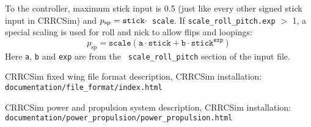 \documentclass[a4paper, 11pt, pdftex]{article}
\newcommand{\vi}[1]{_{\textrm{#1}}}
\begin{document}
    To the controller, maximum stick input is 0.5 (just like every other
    signed stick input in CRRCSim) and $p\vi{sp} = {\tt stick} \cdot ${\tt
    scale}. If {\tt scale\_roll\_pitch.exp} $>$ 1, a special scaling is used for
    roll and nick to allow flips and loopings:    
    \begin{equation}
      p\vi{sp} = \texttt{scale} \left( \texttt{a} \cdot \texttt{stick}
                 + \texttt{b} \cdot \texttt{stick}^\texttt{exp}
                 \right)
    \end{equation}
    Here {\tt a}, {\tt b} and {\tt exp} are from the {\tt
    scale\_roll\_pitch} section of the input file.
        
              
  \clearpage
    
  \begin{thebibliography}{99}
  
      CRRCSim fixed wing file format description,
      CRRCSim installation: {\tt documentation/file\_format/index.html}
      
      CRRCSim power and propulsion system description,
      CRRCSim installation: {\tt documentation/power\_propulsion/power\_propulsion.html}
    
  \end{thebibliography}
\end{document}
